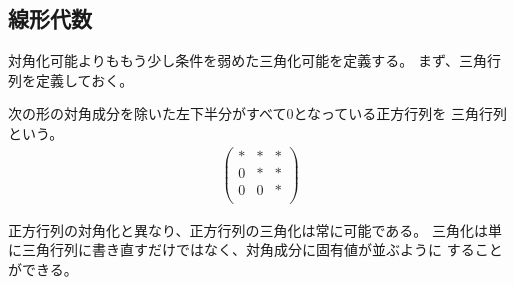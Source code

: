 {\subsection{線形代数}\label{s2:線形代数} %
	対角化可能よりももう少し条件を弱めた三角化可能を定義する。
	まず、三角行列を定義しておく。

	\begin{definition}[三角行列]\label{def:三角行列} %
		次の形の対角成分を除いた左下半分がすべて$0$となっている正方行列を
		三角行列という。
		\begin{equation*}\begin{split}
			\begin{pmatrix}
				* & * & * \\
				0 & * & * \\
				0 & 0 & * \\
			\end{pmatrix}
		\end{split}\end{equation*}
	\end{definition} %

	正方行列の対角化と異なり、正方行列の三角化は常に可能である。
	三角化は単に三角行列に書き直すだけではなく、対角成分に固有値が並ぶように
	することができる。

}
